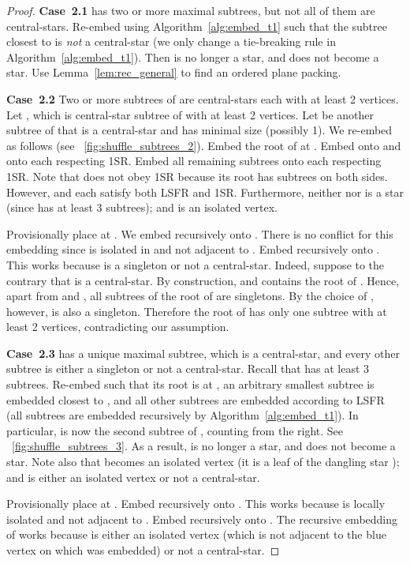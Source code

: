\documentclass[11pt,a4paper,colorlinks=true,urlcolor=blue,citecolor=red]{article}
\theoremstyle{plain}
\newcommand{\case}[1]{\par\vspace{.5\baselineskip}\noindent\textbf{\sffamily Case~#1}}
\begin{document}
\begin{proof}
  \case{2.1}  has two or more maximal subtrees, but not all of them
  are central-stars. Re-embed  using Algorithm~\ref{alg:embed_t1}
  such that the subtree closest to  is \emph{not} a central-star (we
  only change a tie-breaking rule in Algorithm~\ref{alg:embed_t1}). Then
   is no longer a star, and  does not become a
  star. Use Lemma~\ref{lem:rec_general} to find an ordered plane
  packing.

  \case{2.2} Two or more subtrees of  are central-stars each with at
  least 2 vertices. Let , which is central-star
  subtree of  with at least 2 vertices. Let  be another subtree
  of  that is a central-star and has minimal size (possibly 1). We
  re-embed  as follows (see
  \figurename~\ref{fig:shuffle_subtrees_2}). Embed the root of  at
  . Embed  onto  and  onto
   each respecting 1SR. Embed all
  remaining subtrees onto  each respecting 1SR.
  Note that  does not obey 1SR because its root has subtrees on both
  sides. However,  and  each satisfy both LSFR
  and 1SR. Furthermore, neither  nor  is a
  star (since  has at least 3 subtrees); and
   is an isolated vertex.

  Provisionally place  at . We embed  recursively onto
  . There is no conflict for this embedding since 
  is isolated in  and not adjacent to . Embed 
  recursively onto . This works because
   is a singleton or not a central-star. Indeed,
  suppose to the contrary that  is a
  central-star. By construction,
   and contains the root of
  . Hence, apart from  and , all subtrees of the root of
   are singletons. By the choice of , however,  is also a
  singleton. Therefore the root of  has only one subtree with at
  least 2 vertices, contradicting our assumption.

  \case{2.3}  has a unique maximal subtree, which is a central-star,
  and every other subtree is either a singleton or not a central-star.
  Recall that  has at least 3 subtrees. Re-embed  such that its
  root is at , an arbitrary smallest subtree is embedded closest to
  , and all other subtrees are embedded according to LSFR (all
  subtrees are embedded recursively by Algorithm~\ref{alg:embed_t1}). In
  particular,  is now the second subtree of , counting from
  the right. See \figurename~\ref{fig:shuffle_subtrees_3}. As a result,
   is no longer a star, and  does not become a
  star. Note also that  becomes an
  isolated vertex (it is a leaf of the dangling star ); and
   is either an isolated vertex or not a
  central-star.

  Provisionally place  at . Embed  recursively onto
  . This works because  is
  locally isolated and not adjacent to . Embed  recursively onto
  . The recursive embedding of  works because
   is either an isolated vertex (which is not
  adjacent to the blue vertex on which  was embedded) or not a
  central-star.
\end{proof}
\end{document}
